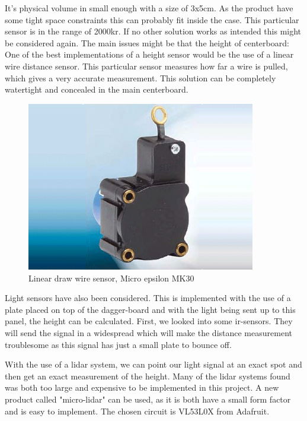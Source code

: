 It's physical volume in small enough with a size of 3x5cm. As the product have some tight space constraints this can probably fit inside the case. This particular sensor is in the range of 2000kr. If no other solution works as intended this might be considered again.
The main issues might be that the height of centerboard: %
One of the best implementations of a height sensor would be the use of a linear wire distance sensor. This particular sensor measures how far a wire is pulled, which gives a very accurate measurement. This solution can be completely watertight and concealed in the main centerboard.  

\begin{figure}[H]%
\begin{center}
	\includegraphics[width = 10cm]{Figures/microepsilon_mk30.png}
	\caption{Linear draw wire sensor, Micro epsilon MK30}
	\label{Draw_sensor}
\end{center}
\end{figure}

Light sensors have also been considered. This is implemented with the use of a plate placed on top of the dagger-board and with the light being sent up to this panel, the height can be calculated. First, we looked into some \gls{ir}-sensors. They will send the signal in a widespread which will make the distance measurement troublesome as this signal has just a small plate to bounce off.

With the use of a \gls{lidar} system, we can point our light signal at an exact spot and then get an exact measurement of the height.  
Many of the \gls{lidar} systems found was both too large and expensive to be implemented in this project.
A new product called "micro-lidar" can be used, as it is both have a small form factor and is easy to implement.
The chosen circuit is VL53L0X from Adafruit\cite{micro_lidar}. 

